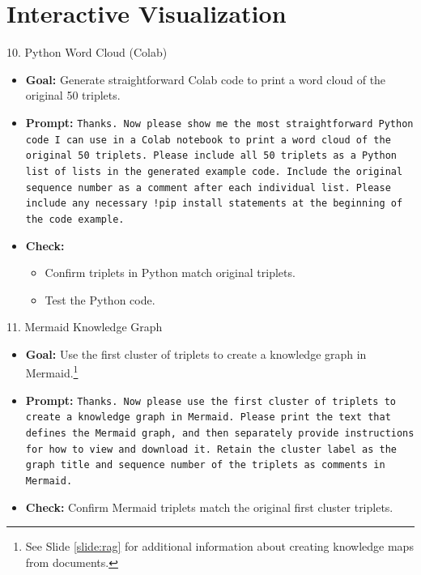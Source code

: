 \documentclass[aspectratio=169]{beamer}
\begin{document}
\section{Interactive Visualization}

\begin{frame}{10. Python Word Cloud (Colab)}
\begin{itemize}
  \item \textbf{Goal:} Generate straightforward Colab code to print a word cloud of the original 50 triplets.
  \item \textbf{Prompt:} \texttt{Thanks. Now please show me the most straightforward Python code I can use in a Colab notebook to print a word cloud of the original 50 triplets. Please include all 50 triplets as a Python list of lists in the generated example code. Include the original sequence number as a comment after each individual list. Please include any necessary !pip install statements at the beginning of the code example.}
  \item \textbf{Check:}
    \begin{itemize}
      \item Confirm triplets in Python match original triplets.
      \item Test the Python code.
    \end{itemize}
\end{itemize}
\end{frame}

\begin{frame}{11. Mermaid Knowledge Graph}\label{slide:map}
\begin{itemize}
  \item \textbf{Goal:} Use the first cluster of triplets to create a knowledge graph in Mermaid.\footnote{See Slide \ref{slide:rag} for additional information about creating knowledge maps from documents.} 
  \item \textbf{Prompt:} \texttt{Thanks. Now please use the first cluster of triplets to create a knowledge graph in Mermaid. Please print the text that defines the Mermaid graph, and then separately provide instructions for how to view and download it. Retain the cluster label as the graph title and sequence number of the triplets as comments in Mermaid.}
  \item \textbf{Check:} Confirm Mermaid triplets match the original first cluster triplets.
\end{itemize}
\end{frame}
\end{document}
